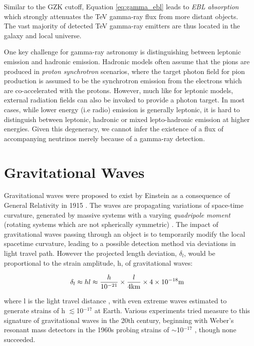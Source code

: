 Similar to the GZK cutoff, Equation \ref{eq:gamma_ebl} leads to \emph{EBL absorption} which strongly attenuates the TeV gamma-ray flux from more distant objects. The vast majority of detected TeV gamma-ray emitters are thus located in the galaxy and local universe.

One key challenge for gamma-ray astronomy is distinguishing between leptonic emission and hadronic emission. Hadronic models often assume that the pions are produced in \emph{proton synchrotron} scenarios, where the target photon field for pion production is assumed to be the synchrotron emission from the electrons which are co-accelerated with the protons. However, much like for leptonic models, external radiation fields can also be invoked to provide a photon target. In most cases, while lower energy (i.e radio) emission is generally leptonic, it is hard to distinguish between leptonic, hadronic or mixed lepto-hadronic emission at higher energies. Given this degeneracy, we cannot infer the existence of a flux of accompanying neutrinos merely because of a gamma-ray detection.

\section{Gravitational Waves}

Gravitational waves were proposed to exist by Einstein as a consequence of General Relativity in 1915 . The waves are propagating variations of space-time curvature, generated by massive systems with a varying \emph{quadripole moment} (rotating systems which are not spherically symmetric) \cite{spurio_18}. The impact of gravitational waves passing through an object is to temporarily modify the local spacetime curvature, leading to a possible detection method via deviations in light travel path. However the projected length deviation, $\delta_{l}$, would be proportional to the strain amplitude, h, of gravitational waves:

\begin{equation}
	\delta_{l} \approx h l \approx  \frac{h}{10^{-21}} \times \frac{l}{4 \textup{km}} \times 4 \times 10^{-18} \textup{m}
\end{equation}

where l is the light travel distance , with even extreme waves estimated to generate strains of h $\lesssim$10$^{-17}$ at Earth. Various experiments tried measure to this signature of gravitational waves in the 20th century, beginning with Weber's resonant mass detectors in the 1960s probing strains of $\sim$10$^{-17}$ , though none succeeded. 

